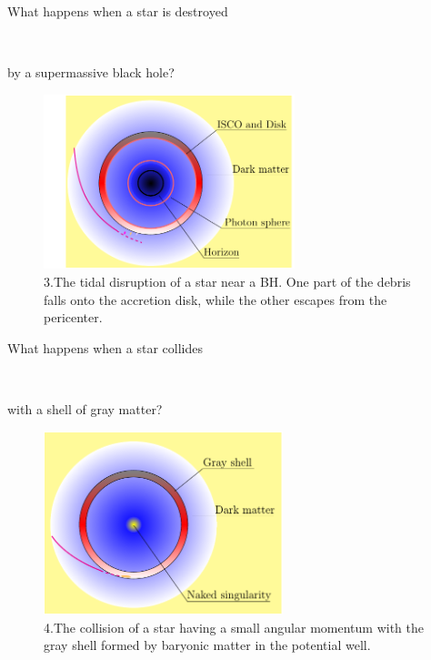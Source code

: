 \documentclass[12pt,aspectratio=139, slidestop,notes=hide]{beamer}
\begin{document}
\begin{frame}
{\centerline{What happens when a star is destroyed}\\ \centerline{by a supermassive black hole?}\vspace{-3ex}}

\vspace{-1ex}
\begin{figure}[]
\begin{center}\hspace{-2em}
\includegraphics [width=0.65\textwidth]{Figure5}
\end{center}\vspace{-1ex}
\caption{3.\;The tidal disruption of a star near a BH. One part of the debris falls onto the accretion disk, while the other escapes from the pericenter.}
\label{fig3}
\end{figure}

\end{frame}


\begin{frame}
{\centerline{What happens when a star collides}\\ \centerline{with a shell of gray matter?}\vspace{-3ex}}

\vspace{-1ex}
\begin{figure}
\begin{center}\hspace{-2em}
\includegraphics [width=0.62\textwidth]{Figure6}
\end{center}\vspace{-1ex}
\caption{4.\;The collision of a star having a small angular momentum with the gray shell formed by baryonic matter in the potential well.}
\end{figure}

\end{frame}
\end{document}
